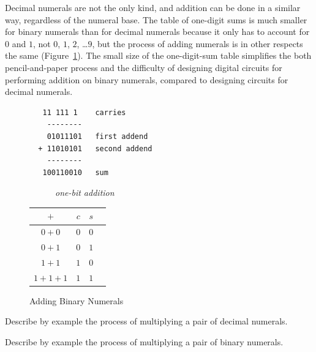 Decimal numerals are not the only kind,
and addition can be done in a similar way, regardless of the numeral base.
The table of one-digit sums is much smaller for binary numerals
than for decimal numerals because it only has to account for $0$ and $1$,
not $0$, $1$, $2$, \dots $9$, but
the process of adding numerals is in other respects
the same (Figure~\ref{fig:adding-binary-numerals}).
The small size of the one-digit-sum table simplifies the
both pencil-and-paper process and the difficulty of designing
digital circuits for performing addition on binary numerals, compared to
designing circuits for decimal numerals.

\begin{figure}[!tbp]
\begin{center}
\begin{minipage}[b]{0.4\textwidth}
\begin{verbatim}
   11 111 1    carries
    --------
    01011101   first addend
  + 11010101   second addend
    --------
   100110010   sum
\end{verbatim}
\end{minipage}
\hfill
\begin{minipage}[b]{0.4\textwidth}
~~~~~~\emph{one-bit addition}\\
\vspace{.05 in}
\begin{tabular}{|c|c|c|c}
 \hline
 $+$      & $c$ & $s$ \\
 \hline
 $0+0$    & $0$ & $0$ \\
 \hline
 $0+1$    & $0$ & $1$ \\
 \hline
 $1+1$    & $1$ & $0$ \\
 \hline
 $1+1+1$  & $1$ & $1$ \\
 \hline
\end{tabular}
\end{minipage}
\end{center}
\caption{Adding Binary Numerals}
\label{fig:adding-binary-numerals}
\end{figure}

\begin{ExerciseList}
\Exercise Describe by example the process of multiplying a pair of decimal numerals.

\Exercise Describe by example the process of multiplying a pair of binary numerals.
\end{ExerciseList}

